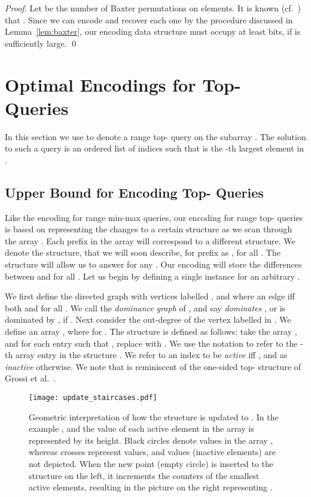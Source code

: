 \documentclass[runningheads]{llncs}
\begin{document}
\begin{proof}
Let  be the number of Baxter permutations on  elements.  It
is known (cf.~\cite{OEIS}) that . Since we can encode and recover each
one by the procedure discussed in Lemma~\ref{lem:baxter}, our encoding
data structure must occupy at least 
bits, if  is sufficiently large. \qed
\end{proof}

\section{Optimal Encodings for Top-\texorpdfstring{}{k} Queries\label{sec:top-k}}

In this section we use  to denote a range
top- query on the subarray .  The solution to such a query
is an ordered list of indices  such that
 is the -th largest element in .

\subsection{Upper Bound for Encoding Top-\texorpdfstring{}{k} Queries\label{sec:encoding-topk}}

Like the encoding for range min-max queries, our encoding for range
top- queries is based on representing the changes to a certain
structure as we scan through the array .  Each prefix in the array
will correspond to a different structure. We denote the structure,
that we will soon describe, for prefix  as , for all
. The structure  will allow us to answer
 for any . Our encoding will store the
differences between  and  for all .
Let us begin by defining a single instance for an arbitrary .

We first define the directed graph  with vertices
labelled , and where an edge  iff both
 and  for all .  We call
 the \emph{dominance graph} of , and say 
\emph{dominates} , or  is dominated by , if .  Next consider the out-degree  of the vertex labelled
 in . We define an array , where
 for .  The structure
 is defined as follows: take the array , and for each
entry  such that , replace  with
.  We use the notation  to refer to the -th
array entry in the structure . We refer to an index  to
be \emph{active} iff , and as \emph{inactive}
otherwise.  We note that  is reminiscent of the one-sided
top- structure of Grossi et al.~\cite{GINRS13}.

\begin{figure}
\centering
\texttt{[image: update\_staircases.pdf]}
\caption{\label{fig:update}Geometric interpretation of how the
  structure  is updated to .  In the example , and the value of each active element in the array is represented
  by its height.  Black circles denote  values in the array
  , whereas crosses represent  values, and  values
  (inactive elements) are not depicted.  When the new point (empty
  circle) is inserted to the structure on the left, it increments the
  counters of the smallest  active elements, resulting in the
  picture on the right representing .}
\end{figure}
\end{document}
